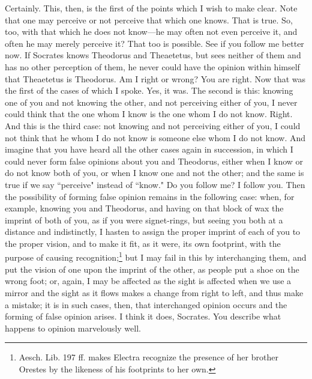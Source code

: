\documentclass[letterpaper,12pt]{article}
\newcommand{\stephpag}[1]{\marginnote{\small\itshape\fontfamily{ppl}\selectfont #1}}
\begin{document}
\begin{drama}
\theaetetusspeaks
Certainly.
\socratesspeaks
This, then, is the first of the points which I wish to make clear. Note that one may perceive or not perceive that which one knows.
\theaetetusspeaks
That is true.
\socratesspeaks
So, too, with that which he does not know—he may often not even perceive it, and often he may merely perceive it?
\theaetetusspeaks
That too is possible.
\socratesspeaks
See if you follow me better now. If Socrates \stephpag{193 a} knows Theodorus and Theaetetus, but sees neither of them and has no other perception of them, he never could have the opinion within himself that Theaetetus is Theodorus. Am I right or wrong?
\theaetetusspeaks
You are right.
\socratesspeaks
Now that was the first of the cases of which I spoke.
\theaetetusspeaks
Yes, it was.
\socratesspeaks
The second is this: knowing one of you and not knowing the other, and not perceiving either of you, I never could think that the one whom I know is the one whom I do not know.
\theaetetusspeaks
Right.
\socratesspeaks
And this is the third case: not knowing and not perceiving either of you, \stephpag{b} I could not think that he whom I do not know is someone else whom I do not know. And imagine that you have heard all the other cases again in succession, in which I could never form false opinions about you and Theodorus, either when I know or do not know both of you, or when I know one and not the other; and the same is true if we say ``perceive" instead of ``know." Do you follow me?
\theaetetusspeaks
I follow you.
\socratesspeaks
Then the possibility of forming false opinion remains in the following case: when, for example, knowing you and Theodorus, and having on that block of wax \stephpag{c} the imprint of both of you, as if you were signet-rings, but seeing you both at a distance and indistinctly, I hasten to assign the proper imprint of each of you to the proper vision, and to make it fit, as it were, its own footprint, with the purpose of causing recognition;\footnote{Aesch. Lib. 197 ff. makes Electra recognize the presence of her brother Orestes by the likeness of his footprints to her own.} but I may fail in this by interchanging them, and put the vision of one upon the imprint of the other, as people put a shoe on the wrong foot; or, again, I may be affected as the sight is affected when we use a mirror and the sight as it flows makes a change from right to left, \stephpag{d} and thus make a mistake; it is in such cases, then, that interchanged opinion occurs and the forming of false opinion arises.
\theaetetusspeaks
I think it does, Socrates. You describe what happens to opinion marvelously well.

\end{drama}
\end{document}
